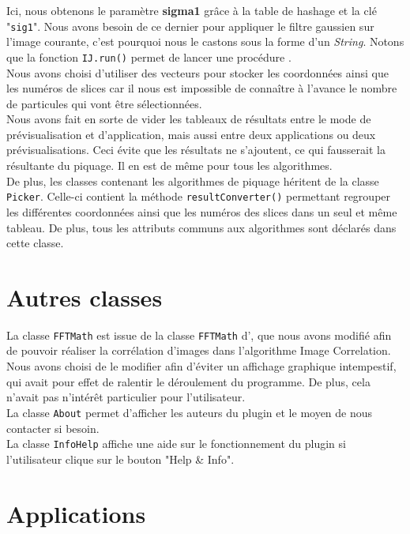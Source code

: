 Ici, nous obtenons le paramètre \textbf{sigma1} grâce à la table de hashage et la clé "\texttt{sig1}". Nous avons besoin de ce dernier pour appliquer le filtre gaussien sur l'image courante, c'est pourquoi nous le castons sous la forme d'un \emph{String}. Notons que la fonction \texttt{IJ.run()} permet de lancer une procédure \imj. \\

Nous avons choisi d'utiliser des vecteurs pour stocker les coordonnées ainsi que les numéros de slices car il nous est impossible de connaître à l'avance le nombre de particules qui vont être sélectionnées. \\
Nous avons fait en sorte de vider les tableaux de résultats entre le mode de prévisualisation et d'application, mais aussi entre deux applications ou deux prévisualisations. Ceci évite que les résultats ne s'ajoutent, ce qui fausserait la résultante du piquage. Il en est de même pour tous les algorithmes. \\

De plus, les classes contenant les algorithmes de piquage héritent de la classe \texttt{Picker}. Celle-ci contient la méthode \texttt{resultConverter()} permettant regrouper les différentes coordonnées ainsi que les numéros des slices dans un seul et même tableau. De plus, tous les attributs communs aux algorithmes sont déclarés dans cette classe. 

\section{Autres classes}

La classe \texttt{FFTMath} est issue de la classe \texttt{FFTMath} d'\imj, que nous avons modifié afin de pouvoir réaliser la corrélation d'images dans l'algorithme Image Correlation. Nous avons choisi de le modifier afin d'éviter un affichage graphique intempestif, qui avait pour effet de ralentir le déroulement du programme. De plus, cela n'avait pas n'intérêt particulier pour l'utilisateur. \\

La classe \texttt{About} permet d'afficher les auteurs du plugin et le moyen de nous contacter si besoin. \\

La classe \texttt{InfoHelp} affiche une aide sur le fonctionnement du plugin si l'utilisateur  clique sur le bouton "Help \& Info". 

\section{Applications}

